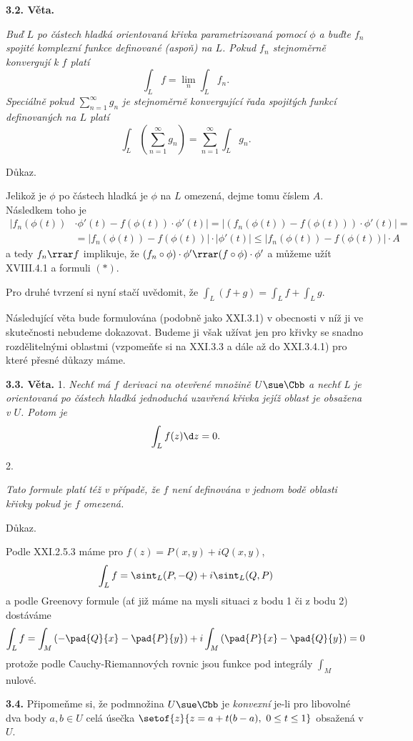 \documentclass[12pt]{article}
\begin{document}
{\bf 3.2. Věta.} {\em Buď $L$ po částech hladká orientovaná křivka parametrizovaná pomocí $\phi$ a buďte $f_n$ spojité komplexní funkce definované (aspoň) na $L$. Pokud $f_n$ stejnoměrně konvergují k  $f$ platí
$$
\int_Lf=\lim_n\int_Lf_n.
$$
Speciálně pokud $\sum_{n=1}^\infty g_n$ je stejnoměrně konvergující řada spojitých funkcí definovaných na $L$ platí
$$
\int_L\left(\sum_{n=1}^\infty g_n\right)=\sum_{n=1}^\infty \int_Lg_n.
$$

Důkaz.}  Jelikož je $\phi$ po částech hladká je $\phi$ na $L$ omezená,  dejme tomu číslem $A$. Následkem toho je
$$
\begin{aligned}
|f_n(\phi(t))&\cdot\phi'(t)-f(\phi(t))\cdot\phi'(t)|=
|(f_n(\phi(t))-f(\phi(t)))\cdot\phi'(t)|=\\
&=|f_n(\phi(t))-f(\phi(t))|\cdot|\phi'(t)|\leq
|f_n(\phi(t))-f(\phi(t))|\cdot A
\end{aligned}
$$
a tedy $f_n\rrar f$ implikuje, že $(f_n\circ\phi)\cdot\phi'\rrar
(f\circ\phi)\cdot\phi'$ a můžeme užít
 XVIII.4.1 a formuli $(*)$.

Pro druhé tvrzení si nyní stačí uvědomit, že
$\int_L(f+g)=\int_Lf+\int_Lg$. \sq
 
 \bigskip

Následující věta bude formulována (podobně jako XXI.3.1) v obecnosti v níž ji ve skutečnosti nebudeme dokazovat. Budeme ji však užívat jen pro křivky se snadno rozdělitelnými oblastmi
 (vzpomeňťe si na XXI.3.3 a dále až do XXI.3.4.1) pro které přesné důkazy máme. 

\medskip

{\bf 3.3. Věta.} 1. {\em Nechť má $f$ derivaci na otevřené množině $U\sue\Cbb$
a nechť L je orientovaná po částech hladká jednoduchá uzavřená křivka jejíž oblast je obsažena v
 $U$. Potom je
$$
\int_Lf(z)\d z=0.
$$}

2. {\em Tato formule platí též v případě, že  $f$ není definována v jednom bodě
 oblasti křivky pokud je $f$ omezená.

Důkaz.} Podle XXI.2.5.3 máme pro $f(z)=P(x,y)+iQ(x,y)$, 
$$
\int_Lf=\sint_L(P,-Q)+i\sint_L(Q,P)
$$
a podle Greenovy formule (ať již máme na mysli situaci z bodu 1
 či z bodu 2)
 dostáváme
$$
\int_Lf=\int_M\left(-\pad{Q}{x}-\pad{P}{y}\right)+i\int_M\left(\pad{P}{x}-\pad{Q}{y}\right)=0
$$
protože podle  Cauchy-Riemannových rovnic jsou funkce pod integrály $\int_M$ nulové. \sq

\bigskip

{\bf 3.4.} Připomeňme si, že podmnožina $U\sue \Cbb$ je  {\em konvexní}
je-li pro libovolné dva body $a,b\in U$ celá úsečka
$\setof{z}{z=a+t(b-a),\ 0\leq t\leq 1}$ obsažená v $U$.
\end{document}
